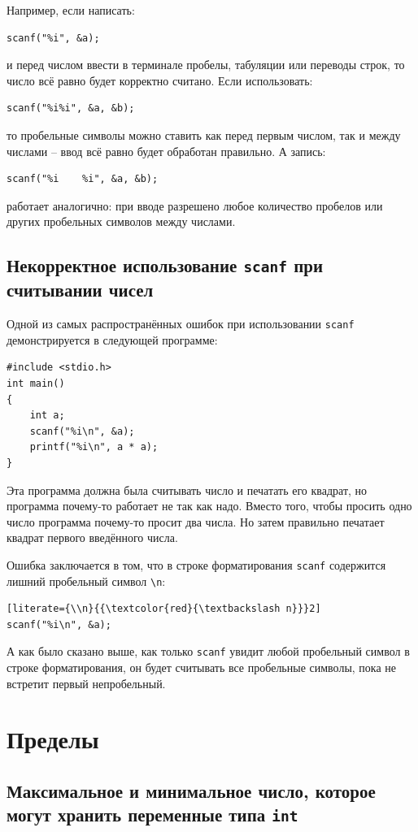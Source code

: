 \documentclass{article}
\begin{document}
Например, если написать:
\begin{lstlisting}
scanf("%i", &a);
\end{lstlisting}
и перед числом ввести в терминале пробелы, табуляции или переводы строк, то число всё равно будет корректно считано. Если использовать:
\begin{lstlisting}
scanf("%i%i", &a, &b);
\end{lstlisting}
то пробельные символы можно ставить как перед первым числом, так и между числами -- ввод всё равно будет обработан правильно. А запись:
\begin{lstlisting}
scanf("%i    %i", &a, &b);
\end{lstlisting}
работает аналогично: при вводе разрешено любое количество пробелов или других пробельных символов между числами.


\subsection*{Некорректное использование \texttt{scanf} при считывании чисел}
Одной из самых распространённых ошибок при использовании \texttt{scanf} демонстрируется в следующей программе:
\begin{lstlisting}
#include <stdio.h>
int main()
{
    int a;
    scanf("%i\n", &a);
    printf("%i\n", a * a);
}
\end{lstlisting}
Эта программа должна была считывать число и печатать его квадрат, но программа почему-то работает не так как надо. Вместо того, чтобы просить одно число программа почему-то просит два числа. Но затем правильно печатает квадрат первого введённого числа.

\noindent Ошибка заключается в том, что в строке форматирования \texttt{scanf} содержится лишний пробельный символ \texttt{\textbackslash n}:
\begin{lstlisting}[literate={\\n}{{\textcolor{red}{\textbackslash n}}}2]
scanf("%i\n", &a);
\end{lstlisting}
А как было сказано выше, как только \texttt{scanf} увидит любой пробельный символ в строке форматирования, он будет считывать все пробельные символы, пока не встретит первый непробельный.


\section*{Пределы}
\subsection*{Максимальное и минимальное число, которое могут хранить переменные типа \texttt{int}}
\end{document}
